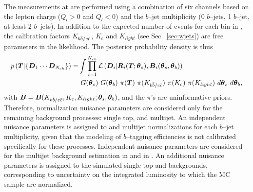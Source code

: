 The measurements at \eighttev{}  are
performed using a combination of six channels based on
the lepton charge ($Q_l>0$ and $Q_l<0$) and the $b$--jet multiplicity
(0 $b$--jets, 1 $b$--jet, at least 2 $b$--jets). In addition to the
expected number of \ttbar{} events for each bin in \Truth{}, the
\wjets{} calibration factors $K_{b\bar{b}{}/c\bar{c}{}}$, $K_c$ and
$K_{light}$ (see Sec.~\ref{sec:wjets}) are free parameters in the likelihood.
The posterior probability density is thus
\begin{equation}
\begin{split}
  p\left(\boldsymbol{T}{}|\{\boldsymbol{D}{}_1\cdots{}\boldsymbol{D}{}_{N_{ch}}\}\right)=&
  \int
  \prod_{i=1}^{N_{ch}}\mathcal{L}\left(\boldsymbol{D}{}_i|\boldsymbol{R}{}_i(\boldsymbol{T}{};\boldsymbol{\theta}{}_s),\boldsymbol{B}{}_i(\boldsymbol{\theta}{}_s,\boldsymbol{\theta}{}_b)\right)\\
&  ~G(\boldsymbol{\theta}{}_s)
  ~G(\boldsymbol{\theta}{}_b)
  ~\pi{}(\boldsymbol{T}{})
  ~\pi{}(K_{b\bar{b}{}/c\bar{c}{}})
  ~\pi{}(K_c)
  ~\pi{}(K_{light})
  ~d\boldsymbol{\theta}{}_s
  ~d\boldsymbol{\theta}{}_b,\\
\end{split}
\end{equation}
with
$\boldsymbol{B}{}=\boldsymbol{B}{}(K_{b\bar{b}{}/c\bar{c}{}},K_c,K_{light};\boldsymbol{\theta}_s,\boldsymbol{\theta}{}_b)$,
and the $\pi{}$'s are uninformative priors.
Therefore, normalization nuisance parameters are considered
only for the remaining background processes: single top, \zjets{} and
multijet. An independent nuisance parameters is assigned to \zjets{}
and multijet normalizations for each $b$--jet multiplicity, given that
the modeling of $b$--tagging efficiencies is not calibrated
specifically for these processes. Independent nuisance parameters are
considered for the multijet background estimation in \mujets{} and in
\ejets{}. An additional nuisance parameters is
assigned to the simulated single top and \zjets{} backgrounds,
corresponding to uncertainty on the integrated luminosity to which the
MC sample are normalized.

